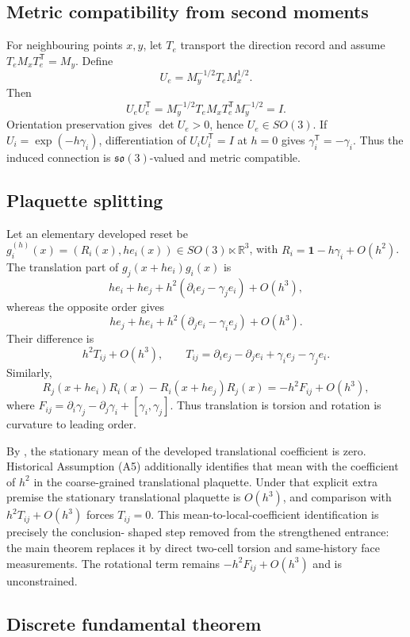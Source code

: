 \documentclass[11pt]{article}
\theoremstyle{definition}
\theoremstyle{remark}
\newcommand{\R}{\mathbb R}
\newcommand{\one}{\mathbf 1}
\newcommand{\so}{\mathfrak{so}}
\begin{document}
\subsection{Metric compatibility from second moments}

For neighbouring points $x,y$, let $T_e$ transport the direction record and
assume $T_eM_xT_e^{\mathsf T}=M_y$.  Define
\[
 U_e=M_y^{-1/2}T_eM_x^{1/2}.
\]
Then
\[
 U_eU_e^{\mathsf T}
 =M_y^{-1/2}T_eM_xT_e^{\mathsf T}M_y^{-1/2}=I.
\]
Orientation preservation gives $\det U_e>0$, hence $U_e\in SO(3)$.  If
$U_i=\exp(-h\gamma_i)$, differentiation of
$U_iU_i^{\mathsf T}=I$ at $h=0$ gives
$\gamma_i^{\mathsf T}=-\gamma_i$.  Thus the induced connection is
$\so(3)$-valued and metric compatible.

\subsection{Plaquette splitting}

Let an elementary developed reset be
$g_i^{(h)}(x)=(R_i(x),he_i(x))\in SO(3)\ltimes\R^3$, with
$R_i=\one-h\gamma_i+O(h^2)$.  The translation part of
$g_j(x+he_i)g_i(x)$ is
\[
 h e_i+h e_j+h^2(\partial_i e_j-\gamma_j e_i)+O(h^3),
\]
whereas the opposite order gives
\[
 h e_j+h e_i+h^2(\partial_j e_i-\gamma_i e_j)+O(h^3).
\]
Their difference is
\[
 h^2T_{ij}+O(h^3),
 \qquad
 T_{ij}=\partial_i e_j-\partial_j e_i+
 \gamma_i e_j-\gamma_j e_i.
\]
Similarly,
\[
 R_j(x+he_i)R_i(x)-R_i(x+he_j)R_j(x)
 =-h^2F_{ij}+O(h^3),
\]
where
$F_{ij}=\partial_i\gamma_j-\partial_j\gamma_i+[\gamma_i,\gamma_j]$.
Thus translation is torsion and rotation is curvature to leading order.

By , the stationary mean of the developed
translational coefficient is zero.  Historical Assumption
\textup{(A5)} additionally identifies that mean with
the coefficient of $h^2$ in the coarse-grained translational plaquette.  Under
that explicit extra premise the stationary translational plaquette is
$O(h^3)$, and comparison with $h^2T_{ij}+O(h^3)$ forces $T_{ij}=0$.
This mean-to-local-coefficient identification is precisely the conclusion-
shaped step removed from the strengthened entrance: the main theorem replaces
it by direct two-cell torsion and same-history face measurements.  The
rotational term remains $-h^2F_{ij}+O(h^3)$ and is unconstrained.

\subsection{Discrete fundamental theorem}
\end{document}
